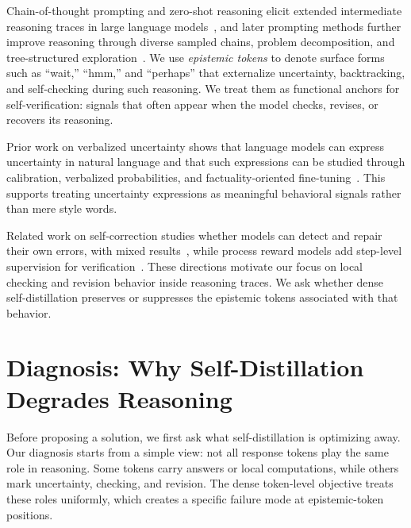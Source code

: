 \documentclass[11pt]{article}
\begin{document}
Chain-of-thought prompting and zero-shot reasoning elicit extended intermediate reasoning traces in large language models~\cite{wei2022chain,kojima2022large}, and later prompting methods further improve reasoning through diverse sampled chains, problem decomposition, and tree-structured exploration~\cite{wang2023selfconsistency,zhou2023leasttomost,yao2023tree}.
We use \textit{epistemic tokens} to denote surface forms such as ``wait,'' ``hmm,'' and ``perhaps'' that externalize uncertainty, backtracking, and self-checking during such reasoning.
We treat them as functional anchors for self-verification: signals that often appear when the model checks, revises, or recovers its reasoning.

Prior work on verbalized uncertainty shows that language models can express uncertainty in natural language and that such expressions can be studied through calibration, verbalized probabilities, and factuality-oriented fine-tuning~\cite{lin2022teaching,kadavath2022language,tian2023fine}.
This supports treating uncertainty expressions as meaningful behavioral signals rather than mere style words.


Related work on self-correction studies whether models can detect and repair their own errors, with mixed results~\cite{madaan2023self,huang2023large}, while process reward models add step-level supervision for verification~\cite{lightman2023lets,uesato2022solving,cobbe2021training}.
These directions motivate our focus on local checking and revision behavior inside reasoning traces.
We ask whether dense self-distillation preserves or suppresses the epistemic tokens associated with that behavior.
\vspace{40pt}
\section{Diagnosis: Why Self-Distillation Degrades Reasoning}
\label{sec:diagnosis}


Before proposing a solution, we first ask what self-distillation is optimizing away.
Our diagnosis starts from a simple view: not all response tokens play the same role in reasoning.
Some tokens carry answers or local computations, while others mark uncertainty, checking, and revision.
The dense token-level objective treats these roles uniformly, which creates a specific failure mode at epistemic-token positions.
\end{document}

